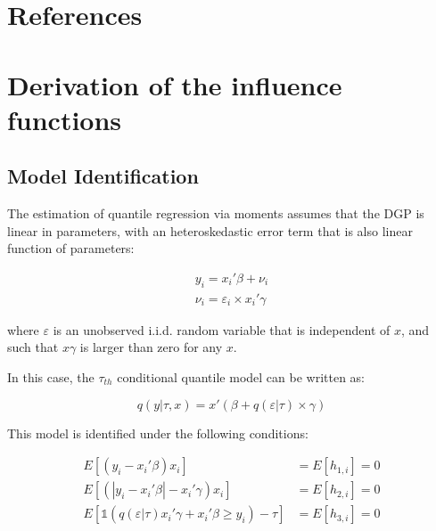 \documentclass[
  authoryear,
  review,
  1p]{elsarticle}
\begin{document}
\hypertarget{references}{%
\section*{References}\label{references}}

\renewcommand{\bibsection}{}


\newpage{}

\appendix

\hypertarget{derivation-of-the-influence-functions}{%
\section{Derivation of the influence
functions}\label{derivation-of-the-influence-functions}}

\hypertarget{model-identification}{%
\subsection{Model Identification}\label{model-identification}}

The estimation of quantile regression via moments assumes that the DGP
is linear in parameters, with an heteroskedastic error term that is also
linear function of parameters:

\[\begin{aligned}
y_i = x_i'\beta + \nu_i \\
\nu_i = \varepsilon_i \times x_i'\gamma
\end{aligned}
\]

where \(\varepsilon\) is an unobserved i.i.d. random variable that is
independent of \(x\), and such that \(x\gamma\) is larger than zero for
any \(x\).

In this case, the \(\tau_{th}\) conditional quantile model can be
written as:

\[q(y|\tau,x) = x'(\beta + q(\varepsilon |\tau) \times \gamma)\]

This model is identified under the following conditions:

\[\begin{aligned}
  E[(y_i-x_i'\beta)x_i ]  &= E[h_{1,i}]=0 \\
  E[ (|y_i-x_i'\beta|-x_i' \gamma) x_i ] &=E[h_{2,i}]=0 \\
  E\left[  \mathbb{1}\left( q(\varepsilon|\tau) x_i'\gamma +x_i'\beta\geq  y_i  \right) - \tau \right] 
   &=E[h_{3,i}]=0 
\end{aligned}
\]
\end{document}
